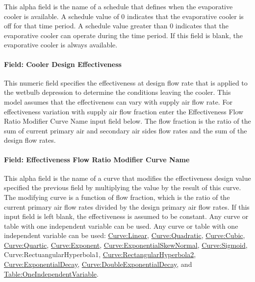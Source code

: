 This alpha field is the name of a schedule that defines when the evaporative cooler is available. A schedule value of 0 indicates that the evaporative cooler is off for that time period. A schedule value greater than 0 indicates that the evaporative cooler can operate during the time period. If this field is blank, the evaporative cooler is always available.

\paragraph{Field: Cooler Design Effectiveness}\label{field-cooler-design-effectiveness}

This numeric field specifies the effectiveness at design flow rate that is applied to the wetbulb depression to determine the conditions leaving the cooler. This model assumes that the effectiveness can vary with supply air flow rate. For effectiveness variation with supply air flow fraction enter the Effectiveness Flow Ratio Modifier Curve Name input field below. The flow fraction is the ratio of the sum of current primary air and secondary air sides flow rates and the sum of the design flow rates.

\paragraph{Field: Effectiveness Flow Ratio Modifier Curve Name}\label{field-effectiveness-flow-ratio-modifier-curve-name}

This alpha field is the name of a curve that modifies the effectiveness design value specified the previous field by multiplying the value by the result of this curve. The modifying curve is a function of flow fraction, which is the ratio of the current primary air flow rates divided by the design primary air flow rates. If this input field is left blank, the effectiveness is assumed to be constant. Any curve or table with one independent variable can be used. Any curve or table with one independent variable can be used: \hyperref[curvelinear]{Curve:Linear}, \hyperref[curvequadratic]{Curve:Quadratic}, \hyperref[curvecubic]{Curve:Cubic}, \hyperref[curvequartic]{Curve:Quartic}, \hyperref[curveexponent]{Curve:Exponent}, \hyperref[curveexponentialskewnormal]{Curve:ExponentialSkewNormal}, \hyperref[curvesigmoid]{Curve:Sigmoid}, Curve:RectuangularHyperbola1, \hyperref[curverectangularhyperbola2]{Curve:RectangularHyperbola2}, \hyperref[curveexponentialdecay]{Curve:ExponentialDecay}, \hyperref[curvedoubleexponentialdecay]{Curve:DoubleExponentialDecay}, and \hyperref[tableoneindependentvariable]{Table:OneIndependentVariable}.

